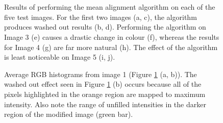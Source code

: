 \documentclass[journal,transmag]{IEEEtran}
\begin{document}
\begin{figure}[t]
{	} 
	 \\
	 \\
\caption{Results of performing the mean alignment algorithm on each of the five test images.  For the first two images (a, c), the algorithm produces washed out results (b, d).  Performing the algorithm on Image 3 (e) causes a drastic change in colour (f), whereas the results for Image 4 (g) are far more natural (h).  The effect of the algorithm is least noticeable on Image 5 (i, j).}
\label{fig:results}
\end{figure}

\begin{figure}[b]
	\centering
\caption{Average RGB histograms from image 1 (Figure \ref{fig:results} (a, b)).  The washed out effect seen in Figure \ref{fig:results} (b) occurs because all of the pixels highlighted in the orange region are mapped to maximum intensity.  Also note the range of unfilled intensities in the darker region of the modified image (green bar).}
\label{fig:image01_hists}
\end{figure}
\end{document}
